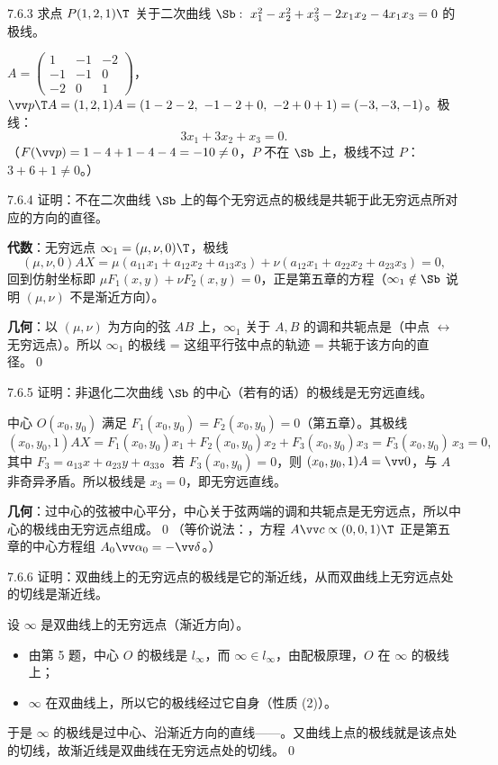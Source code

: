 \begin{ex}{7.6.3}
求点 $P(1,2,1)\T$ 关于二次曲线 $\Sb:\ x_1^2-x_2^2+x_3^2-2x_1x_2-4x_1x_3=0$ 的极线。
\end{ex}
\jie $A=\begin{pmatrix}1&-1&-2\\-1&-1&0\\-2&0&1\end{pmatrix}$，$\vv p\T A=(1,2,1)A=(1-2-2,\ -1-2+0,\ -2+0+1)=(-3,-3,-1)$。极线：
\[
3x_1+3x_2+x_3=0 .
\]
（$F(\vv p)=1-4+1-4-4=-10\neq0$，$P$ 不在 $\Sb$ 上，极线不过 $P$：$3+6+1\neq0$。）

\begin{ex}{7.6.4}
证明：不在二次曲线 $\Sb$ 上的每个无穷远点的极线是共轭于此无穷远点所对应的方向的直径。
\end{ex}
\zheng\textbf{代数}：无穷远点 $\infty_1=(\mu,\nu,0)\T$，极线
\[
(\mu,\nu,0)AX=\mu(a_{11}x_1+a_{12}x_2+a_{13}x_3)+\nu(a_{12}x_1+a_{22}x_2+a_{23}x_3)=0,
\]
回到仿射坐标即 $\mu F_1(x,y)+\nu F_2(x,y)=0$，正是第五章的方程（$\infty_1\notin\Sb$ 说明 $(\mu,\nu)$ 不是渐近方向）。

\textbf{几何}：以 $(\mu,\nu)$ 为方向的弦 $AB$ 上，$\infty_1$ 关于 $A,B$ 的调和共轭点是（中点 $\leftrightarrow$ 无穷远点）。所以 $\infty_1$ 的极线 = 这组平行弦中点的轨迹 = 共轭于该方向的直径。\qed

\begin{ex}{7.6.5}
证明：非退化二次曲线 $\Sb$ 的中心（若有的话）的极线是无穷远直线。
\end{ex}
\zheng 中心 $O(x_0,y_0)$ 满足 $F_1(x_0,y_0)=F_2(x_0,y_0)=0$（第五章）。其极线
\[
(x_0,y_0,1)AX=F_1(x_0,y_0)x_1+F_2(x_0,y_0)x_2+F_3(x_0,y_0)x_3=F_3(x_0,y_0)\,x_3=0,
\]
其中 $F_3=a_{13}x+a_{23}y+a_{33}$。若 $F_3(x_0,y_0)=0$，则 $(x_0,y_0,1)A=\vv0$，与 $A$ 非奇异矛盾。所以极线是 $x_3=0$，即无穷远直线。

\textbf{几何}：过中心的弦被中心平分，中心关于弦两端的调和共轭点是无穷远点，所以中心的极线由无穷远点组成。\qed\quad（等价说法：，方程 $A\vv c\propto(0,0,1)\T$ 正是第五章的中心方程组 $A_0\vv\alpha_0=-\vv\delta$。）

\begin{ex}{7.6.6}
证明：双曲线上的无穷远点的极线是它的渐近线，从而双曲线上无穷远点处的切线是渐近线。
\end{ex}
\zheng 设 $\infty$ 是双曲线上的无穷远点（渐近方向）。
\begin{itemize}
\item 由第 5 题，中心 $O$ 的极线是 $l_\infty$，而 $\infty\in l_\infty$，由配极原理，$O$ 在 $\infty$ 的极线上；
\item $\infty$ 在双曲线上，所以它的极线经过它自身（性质 (2)）。
\end{itemize}
于是 $\infty$ 的极线是过中心、沿渐近方向的直线——。又曲线上点的极线就是该点处的切线，故渐近线是双曲线在无穷远点处的切线。\qed

